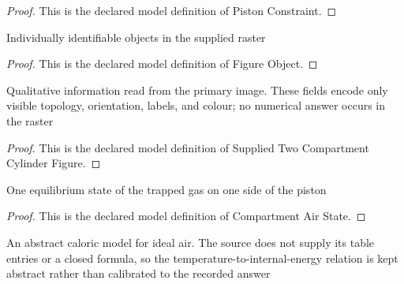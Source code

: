 \begin{proof}
  This is the declared model definition of Piston Constraint.
\end{proof}
\begin{definition}
  \label{def:physics:phyx-mini-0458:phyxminiproblems-problemphyxmini0458-figureobject}
  Individually identifiable objects in the supplied raster
\end{definition}
\begin{proof}
  This is the declared model definition of Figure Object.
\end{proof}
\begin{definition}
  \label{def:physics:phyx-mini-0458:phyxminiproblems-problemphyxmini0458-suppliedtwocompartmentcylinderfigure}
  Qualitative information read from the primary image. These fields encode only visible topology, orientation, labels, and colour; no numerical answer occurs in the raster
\end{definition}
\begin{proof}
  This is the declared model definition of Supplied Two Compartment Cylinder Figure.
\end{proof}
\begin{definition}
  \label{def:physics:phyx-mini-0458:phyxminiproblems-problemphyxmini0458-compartmentairstate}
  One equilibrium state of the trapped gas on one side of the piston
\end{definition}
\begin{proof}
  This is the declared model definition of Compartment Air State.
\end{proof}
\begin{definition}
  \label{def:physics:phyx-mini-0458:phyxminiproblems-problemphyxmini0458-idealaircaloricmodel}
  An abstract caloric model for ideal air. The source does not supply its table entries or a closed formula, so the temperature-to-internal-energy relation is kept abstract rather than calibrated to the recorded answer
\end{definition}
